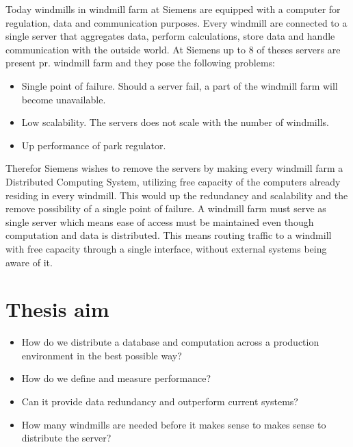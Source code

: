 Today windmills in windmill farm at Siemens are equipped with a computer for regulation, data and communication purposes. Every windmill are connected to a single server that aggregates data, perform calculations, store data and handle communication with the outside world. At Siemens up to 8 of theses servers are present pr. windmill farm and they pose the following problems:
\begin{itemize} 
	\item Single point of failure. Should a server fail, a part of the windmill farm will become unavailable.
	\item Low scalability. The servers does not scale with the number of windmills.
	\item Up performance of park regulator.
\end{itemize}

Therefor Siemens wishes to remove the servers by making every windmill farm a Distributed Computing System, utilizing free capacity of the computers already residing in every windmill. This would up the redundancy and scalability and the remove possibility of a single point of failure. A windmill farm must serve as single server which means ease of access must be maintained even though computation and data is distributed. This means routing traffic to a windmill with free capacity through a single interface, without external systems being aware of it.


\section{Thesis aim}

\begin{itemize}
	\item How do we distribute a database and computation across a production environment in the best possible way?
	\item How do we define and measure performance?
	\item Can it provide data redundancy and outperform current systems?
	\item How many windmills are needed before it makes sense to makes sense to distribute the server?
\end{itemize}


